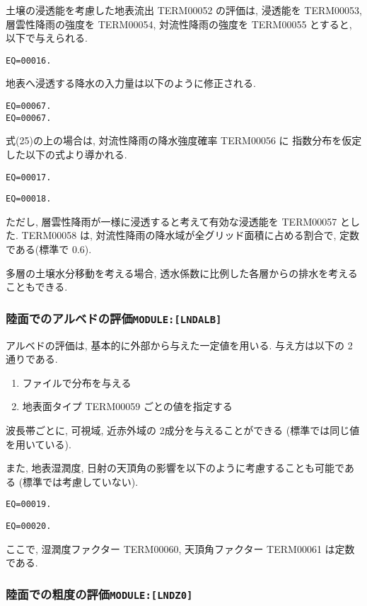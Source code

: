 土壌の浸透能を考慮した地表流出 TERM00052 の評価は, 浸透能を TERM00053, 
層雲性降雨の強度を TERM00054, 対流性降雨の強度を TERM00055 とすると, 
以下で与えられる. 
\begin{verbatim}
EQ=00016.
\end{verbatim}
地表へ浸透する降水の入力量は以下のように修正される. 
\begin{verbatim}
EQ=00067.
EQ=00067.
\end{verbatim}
式(25)の上の場合は, 対流性降雨の降水強度確率 TERM00056 に
指数分布を仮定した以下の式より導かれる. 
\begin{verbatim}
EQ=00017.
\end{verbatim}
\begin{verbatim}
EQ=00018.
\end{verbatim}
ただし, 層雲性降雨が一様に浸透すると考えて有効な浸透能を
TERM00057 とした. 
TERM00058 は, 対流性降雨の降水域が全グリッド面積に占める割合で, 
定数である(標準で 0.6). 

多層の土壌水分移動を考える場合, 
透水係数に比例した各層からの排水を考えることもできる. 

\subsubsection{陸面でのアルベドの評価\texttt{MODULE:[LNDALB]}}

アルベドの評価は, 基本的に外部から与えた一定値を用いる. 
与え方は以下の 2通りである. 
\begin{enumerate}
    \item ファイルで分布を与える
    \item 地表面タイプ TERM00059 ごとの値を指定する
\end{enumerate}

波長帯ごとに, 可視域, 近赤外域の 2成分を与えることができる
(標準では同じ値を用いている). 

また, 地表湿潤度, 日射の天頂角の影響を以下のように考慮することも可能である
(標準では考慮していない). 
\begin{verbatim}
EQ=00019.
\end{verbatim}
\begin{verbatim}
EQ=00020.
\end{verbatim}
ここで, 湿潤度ファクター TERM00060, 天頂角ファクター TERM00061 は定数である. 

\subsubsection{陸面での粗度の評価\texttt{MODULE:[LNDZ0]}}

